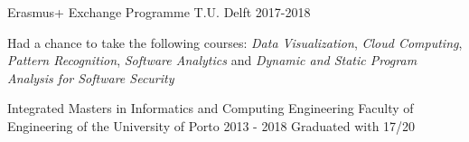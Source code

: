 

\begin{cventries}

  \cventry
    {Erasmus+ Exchange Programme}
    {T.U. Delft}
    {}
    {2017-2018}
    {
    \begin{cvitems} %
        \item {Had a chance to take the following courses: \textit{Data Visualization}, \textit{Cloud Computing}, \textit{Pattern Recognition}, \textit{Software Analytics} and \textit{Dynamic and Static Program Analysis for Software Security}}
    \end{cvitems}
    }
  

  \cventry
    {Integrated Masters in Informatics and Computing Engineering} %
    {Faculty of Engineering of the University of Porto} %
    {} %
    {2013 - 2018} %
    {Graduated with 17/20}

\end{cventries}
